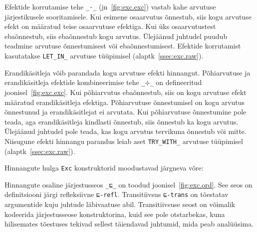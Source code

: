 \documentclass[a4paper,12pt]{article}
\begin{document}
Efektide korrutamise tehe {\tt _·_} (jn~\ref{fig:exc.exc}) vastab kahe arvutuse järjestikusele sooritamisele.
Kui esimene osaarvutus õnnestub, siis kogu arvutuse efekt on määratud teise osaarvutuse efektiga.
Kui üks osaarvutustest ebaõnnestub, siis ebaõnnestub kogu arvutus.
Ülejäänud juhtudel puudub teadmine arvutuse õnnestumisest või ebaõnnestumisest.
Efektide korrutamist kasutatakse {\tt LET_IN_} arvutuse tüüpimisel (alaptk~\ref{ssec:exc.raw}).

Erandikäsitleja võib parandada kogu arvutuse efekti hinnangut.
Põhiarvutuse ja erandikäsitleja efektide kombineerimise tehe {\tt _⊹_} on defineeritud joonisel~\ref{fig:exc.exc}.
Kui põhiarvutus ebaõnnestub, siis on kogu arvutuse efekt määratud erandikäsitleja efektiga.
Põhiarvutuse õnnestumisel on kogu arvutus õnnestunud ja erandikäsitlejat ei arvutata.
Kui põhiarvutuse õnnestumine pole teada, aga erandikäsitleja kindlasti õnnestub, siis õnnestub ka kogu arvutus.
Ülejäänud juhtudel pole teada, kas kogu arvutus tervikuna õnnestub või mitte.
Niisugune efekti hinnangu parandus leiab aset {\tt TRY_WITH_} arvutuse tüüpimisel (alaptk~\ref{ssec:exc.raw}).

Hinnangute hulga {\tt Exc} konstruktorid moodustavad järgneva võre:
\begin{center}
\end{center}
Hinnangute osaline järjestusseos {\tt _⊑_} on toodud joonisel~\ref{fig:exc.ord}.
See seos on definitsiooni järgi refleksiivne {\tt ⊑-refl}.
Transitiivsus {\tt ⊑-trans} on tõestatav argumentide kuju juhtude läbivaatuse abil.
Transitiivsuse seost on võimalik kodeerida järjestusseose konstruktorina, kuid see pole otstarbekas,
kuna hilisemates tõestuses tekivad sellest täiendavad juhtumid, mida peab analüüsima.
\end{document}
